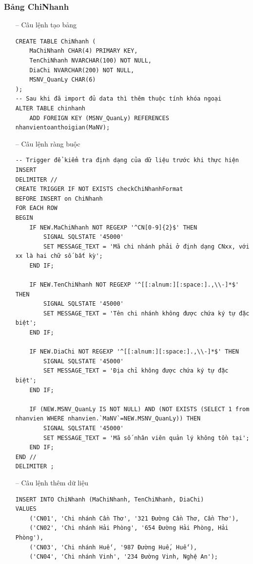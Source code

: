 \subsubsection{Bảng ChiNhanh}
\begin{itemize}
    \item [--] Câu lệnh tạo bảng
   \begin{verbatim}
CREATE TABLE ChiNhanh (
    MaChiNhanh CHAR(4) PRIMARY KEY,
    TenChiNhanh NVARCHAR(100) NOT NULL,
    DiaChi NVARCHAR(200) NOT NULL,
    MSNV_QuanLy CHAR(6)
);
-- Sau khi đã import đủ data thì thêm thuộc tính khóa ngoại
ALTER TABLE chinhanh 
    ADD FOREIGN KEY (MSNV_QuanLy) REFERENCES nhanvientoanthoigian(MaNV);
    \end{verbatim}
    \newpage
    \item [--] Câu lệnh ràng buộc
    \begin{verbatim}
-- Trigger để kiểm tra định dạng của dữ liệu trước khi thực hiện INSERT
DELIMITER //
CREATE TRIGGER IF NOT EXISTS checkChiNhanhFormat
BEFORE INSERT on ChiNhanh
FOR EACH ROW
BEGIN 
    IF NEW.MaChiNhanh NOT REGEXP '^CN[0-9]{2}$' THEN
        SIGNAL SQLSTATE '45000'
        SET MESSAGE_TEXT = 'Mã chi nhánh phải ở định dạng CNxx, với xx là hai chữ số bất kỳ';
    END IF;

    IF NEW.TenChiNhanh NOT REGEXP '^[[:alnum:][:space:].,\\-]*$' THEN 
        SIGNAL SQLSTATE '45000'
        SET MESSAGE_TEXT = 'Tên chi nhánh không được chứa ký tự đặc biệt';
    END IF;

    IF NEW.DiaChi NOT REGEXP '^[[:alnum:][:space:].,\\-]*$' THEN 
        SIGNAL SQLSTATE '45000'
        SET MESSAGE_TEXT = 'Địa chỉ không được chứa ký tự đặc biệt';
    END IF;

    IF (NEW.MSNV_QuanLy IS NOT NULL) AND (NOT EXISTS (SELECT 1 from nhanvien WHERE nhanvien.`MaNV`=NEW.MSNV_QuanLy)) THEN
        SIGNAL SQLSTATE '45000'
        SET MESSAGE_TEXT = 'Mã số nhân viên quản lý không tồn tại';
    END IF;
END //
DELIMITER ;
    \end{verbatim}
    \newpage
    \item [--] Câu lệnh thêm dữ liệu
   \begin{verbatim}
INSERT INTO ChiNhanh (MaChiNhanh, TenChiNhanh, DiaChi) 
VALUES 
    ('CN01', 'Chi nhánh Cần Thơ', '321 Đường Cần Thơ, Cần Thơ'),
    ('CN02', 'Chi nhánh Hải Phòng', '654 Đường Hải Phòng, Hải Phòng'),
    ('CN03', 'Chi nhánh Huế', '987 Đường Huế, Huế'),
    ('CN04', 'Chi nhánh Vinh', '234 Đường Vinh, Nghệ An');
    

\end{verbatim}
\end{itemize}
